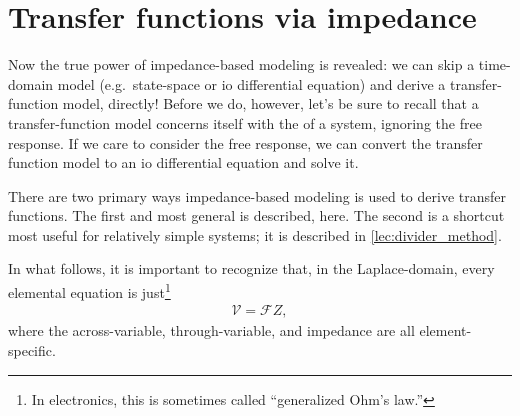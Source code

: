 \documentclass[dynamic_systems.tex]{subfiles}
\begin{document}
\vspace{1\baselineskip}

\section{Transfer functions via impedance}
\tags{}
\label{lec:transfer_functions_via_impedance}

Now the true power of impedance-based modeling is revealed: we can skip a time-domain model (e.g.\ state-space or io differential equation) and derive a transfer-function model, directly!
Before we do, however, let's be sure to recall that a transfer-function model concerns itself with the  of a system, ignoring the free response.
If we care to consider the free response, we can convert the transfer function model to an io differential equation and solve it.
\tags{}

There are two primary ways impedance-based modeling is used to derive transfer functions.
The first and most general is described, here.
The second is a shortcut most useful for relatively simple systems; it is described in \cref{lec:divider_method}.
\tags{}

In what follows, it is important to recognize that, in the Laplace-domain, every elemental equation is just\footnote{In electronics, this is sometimes called ``generalized Ohm's law.''}
\begin{align}
	\mathcal{V} = \mathcal{F} Z,
\end{align}
where the across-variable, through-variable, and impedance are all element-specific.
\tags{}
\end{document}
